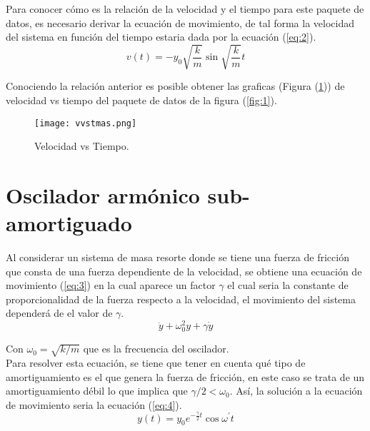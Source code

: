 \documentclass[12pt]{article}
\begin{document}
Para conocer cómo es la relación de la velocidad y el tiempo para este paquete de datos, es necesario derivar la ecuación de movimiento, de tal forma la velocidad del sistema en función del tiempo estaria dada por la ecuación (\ref{eq:2}).
\\

\begin{equation}\label{eq:2}
    v(t)=-y_{0}\sqrt{\frac{k}{m}}\sin{\sqrt{\frac{k}{m}}t}
 \end{equation}
 
Conociendo la relación anterior es posible obtener las graficas (Figura (\ref{fig:2})) de velocidad vs tiempo del paquete de datos de la figura (\ref{fig:1}).
\\

\begin{figure}[h!]
	\texttt{[image: vvstmas.png]}
	\caption{Velocidad vs Tiempo.}
	\label{fig:2}
\end{figure}

\section{Oscilador armónico sub-amortiguado}

Al considerar un sistema de masa resorte donde se tiene una fuerza de fricción que consta de una fuerza dependiente de la velocidad, se obtiene una ecuación de movimiento (\ref{eq:3}) en la cual aparece un factor $\gamma$ el cual seria la constante de proporcionalidad de la fuerza respecto a la velocidad, el movimiento del sistema dependerá de el valor de $\gamma$.
\\

\begin{equation}\label{eq:3}
    \ddot{y}+\omega_{0}^2y+\gamma\dot{y}
 \end{equation}

Con $\omega_{0}=\sqrt{k/m}$ que es la frecuencia del oscilador.
\\

Para resolver esta ecuación, se tiene que tener en cuenta qué tipo de amortiguamiento es el que genera la fuerza de fricción, en este caso se trata de un amortiguamiento débil lo que implica que $\gamma/2<\omega_{0}$. Así, la solución a la ecuación de movimiento seria la ecuación (\ref{eq:4}).
\\

\begin{equation}\label{eq:4}
    y(t)=y_{0}e^{-\frac{\gamma}{2}t}\cos{\omega^{'}t}
 \end{equation}
\end{document}
